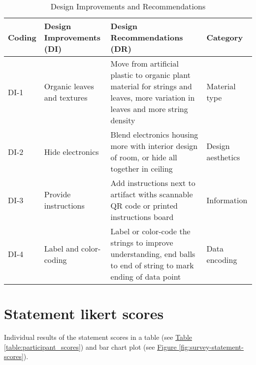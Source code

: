 \begin{appendices}
\begin{table}[h!]
\centering
\begin{tabular}{| p{1.5cm} | p{4cm} | p{8cm} | p{3cm} |}
\hline
\textbf{Coding} & \textbf{Design Improvements (DI)} & \textbf{Design Recommendations (DR)} & \textbf{Category} \\ 
\hline
DI-1 & Organic leaves and textures & Move from artificial plastic to organic plant material for strings and leaves, more variation in leaves and more string density & Material type \\ 
\hline
DI-2 & Hide electronics & Blend electronics housing more with interior design of room, or hide all together in ceiling & Design aesthetics \\ 
\hline
DI-3 & Provide instructions & Add instructions next to artifact withs scannable QR code or printed instructions board & Information \\ 
\hline
DI-4 & Label and color-coding & Label or color-code the strings to improve understanding, end balls to end of string to mark ending of data point & Data encoding \\ 
\hline
\end{tabular}
\caption{Design Improvements and Recommendations}
\label{table:design_improvements}
\end{table}

\section{Statement likert scores}
\label{appendix:implications}

Individual results of the statement scores in a table (see \hyperref[table:participant_scores]{Table \ref{table:participant_scores}}) and bar chart plot (see \hyperref[fig:survey-statement-scores]{Figure \ref{fig:survey-statement-scores}}).


\end{appendices}
